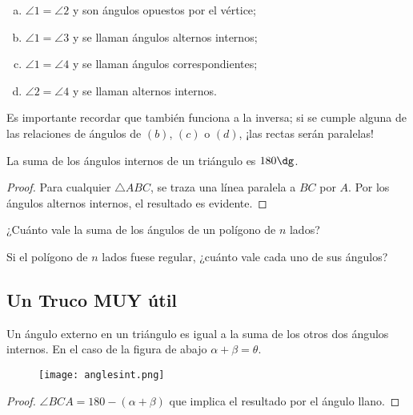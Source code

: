 \begin{enumerate}[(a)]
    \item $\angle 1 = \angle 2$ y son ángulos opuestos por el vértice; 
    \item $\angle 1 = \angle 3$ y se llaman ángulos alternos internos;
    \item $\angle 1 = \angle 4$ y se llaman ángulos correspondientes;
    \item $\angle 2 = \angle 4$ y se llaman alternos internos.
\end{enumerate}

Es importante recordar que también funciona a la inversa; si se 
cumple alguna de las relaciones de ángulos de $(b)$, $(c)$ o $(d)$, 
¡las rectas serán paralelas!

\begin{theorem}
    La suma de los ángulos internos de un triángulo es $180\dg$.
\end{theorem}

\begin{proof}
    Para cualquier $\triangle ABC$, se traza una línea paralela 
    a $BC$ por $A$. Por los ángulos alternos internos, el resultado 
    es evidente.
\end{proof}

\begin{question}
    ¿Cuánto vale la suma de los ángulos de un polígono de $n$ 
    lados?
\end{question}

\begin{question}
    Si el polígono de $n$ lados fuese regular, 
    ¿cuánto vale cada uno de sus ángulos?
\end{question}

\subsection{Un Truco MUY útil}

\begin{lemma}
    Un ángulo externo en un triángulo es igual a la suma de los otros 
    dos ángulos internos. En el caso de la figura de abajo 
    $\alpha + \beta = \theta$.
\end{lemma}

\begin{figure}[h]
    \centering
    \texttt{[image: anglesint.png]}
\end{figure}

\begin{proof}
    $\angle BCA = 180 - (\alpha + \beta)$ que implica el resultado 
    por el ángulo llano. 
\end{proof}

